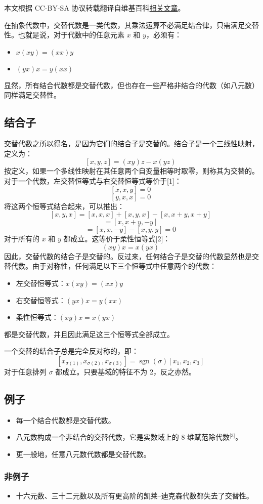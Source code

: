
本文根据 CC-BY-SA 协议转载翻译自维基百科\href{https://en.wikipedia.org/wiki/Alternative_algebra}{相关文章}。

在抽象代数中，交替代数是一类代数，其乘法运算不必满足结合律，只需满足交替性。也就是说，对于代数中的任意元素 $x$ 和 $y$，必须有：
\begin{itemize}
\item $x(xy) = (xx)y$
\item $(yx)x = y(xx)$
\end{itemize}
显然，所有结合代数都是交替代数，但也存在一些严格非结合的代数（如八元数）同样满足交替性。
\subsection{结合子}
交替代数之所以得名，是因为它们的结合子是交替的。结合子是一个三线性映射，定义为：
$$
[x, y, z] = (xy)z - x(yz)~
$$
按定义，如果一个多线性映射在其任意两个自变量相等时取零，则称其为交替的。对于一个代数，左交替恒等式与右交替恒等式等价于[1]：
$$
[x, x, y] = 0~
$$
$$
[y, x, x] = 0~
$$
将这两个恒等式结合起来，可以推出：
$$
[x, y, x] = [x, x, x] + [x, y, x] - [x, x+y, x+y]~
$$
$$
= [x, x+y, -y]~
$$
$$
= [x, x, -y] - [x, y, y] = 0~
$$
对于所有的 $x$ 和 $y$ 都成立。这等价于柔性恒等式[2]：
$$
(xy)x = x(yx)~
$$
因此，交替代数的结合子是交替的。反过来，任何结合子是交替的代数显然也是交替代数。由于对称性，任何满足以下三个恒等式中任意两个的代数：
\begin{itemize}
\item 左交替恒等式：$x(xy) = (xx)y$
\item 右交替恒等式：$(yx)x = y(xx)$
\item 柔性恒等式：$(xy)x = x(yx)$
\end{itemize}
都是交替代数，并且因此满足这三个恒等式全部成立。

一个交替的结合子总是完全反对称的，即：
$$
[x_{\sigma(1)}, x_{\sigma(2)}, x_{\sigma(3)}] = \operatorname{sgn}(\sigma) [x_1, x_2, x_3]~
$$
对于任意排列 $\sigma$ 都成立。只要基域的特征不为 2，反之亦然。
\subsection{例子}
\begin{itemize}
\item 每一个结合代数都是交替代数。
\item 八元数构成一个非结合的交替代数，它是实数域上的 8 维赋范除代数\(^\text{[3]}\)。
\item 更一般地，任意八元数代数都是交替代数。
\end{itemize}
\subsubsection{非例子}
\begin{itemize}
\item 十六元数、三十二元数以及所有更高阶的凯莱–迪克森代数都失去了交替性。
\end{itemize}
